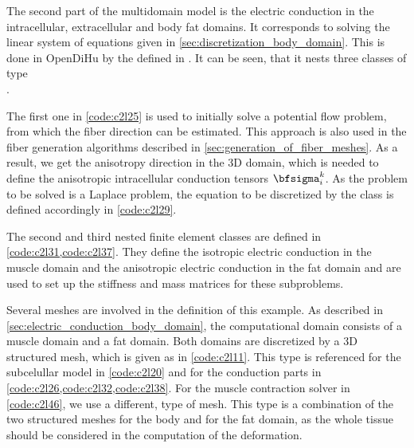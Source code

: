 The second part of the multidomain model is the electric conduction in the intracellular, extracellular and body fat domains. It corresponds to solving the linear system of equations given in \cref{sec:discretization_body_domain}. This is done in OpenDiHu by the  defined in . It can be seen, that it nests three classes of type \\. 

The first one in \cref{code:c2l25} is used to initially solve a potential flow problem, from which the fiber direction can be estimated. This approach \cite{Choi2013} is also used in the fiber generation algorithms described in \cref{sec:generation_of_fiber_meshes}. As a result, we get the anisotropy direction in the 3D domain, which is needed to define the anisotropic intracellular conduction tensors $\bfsigma_i^k$. As the problem to be solved is a Laplace problem, the equation to be discretized by the class is defined accordingly in \cref{code:c2l29}.

The second and third nested finite element classes are defined in \cref{code:c2l31,code:c2l37}. They define the isotropic electric conduction in the muscle domain and the anisotropic electric conduction in the fat domain and are used to set up the stiffness and mass matrices for these subproblems.

Several meshes are involved in the definition of this example. As described in \cref{sec:electric_conduction_body_domain}, the computational domain consists of a muscle domain and a fat domain. Both domains are discretized by a 3D structured mesh, which is given as  in \cref{code:c2l11}. This type is referenced for the subcelullar model in \cref{code:c2l20} and for the conduction parts in \cref{code:c2l26,code:c2l32,code:c2l38}. 
For the muscle contraction solver in \cref{code:c2l46}, we use a different,  type of mesh. This type is a combination of the two structured meshes for the body and for the fat domain, as the whole tissue should be considered in the computation of the deformation.

